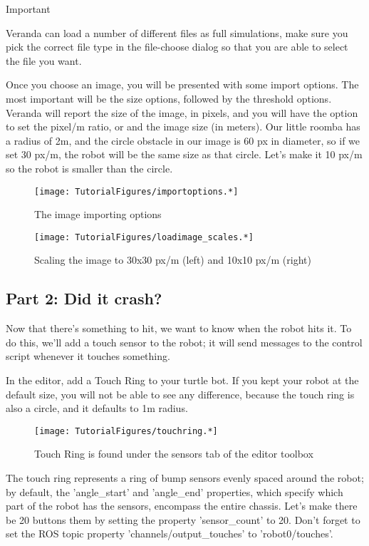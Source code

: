 Important

Veranda can load a number of different files as full simulations, make
sure you pick the correct file type in the file-choose dialog so that
you are able to select the file you want.

Once you choose an image, you will be presented with some import
options. The most important will be the size options, followed by the
threshold options. Veranda will report the size of the image, in pixels,
and you will have the option to set the pixel/m ratio, or and the image
size (in meters). Our little roomba has a radius of 2m, and the circle
obstacle in our image is 60 px in diameter, so if we set 30 px/m, the
robot will be the same size as that circle. Let's make it 10 px/m so the
robot is smaller than the circle.

\begin{figure}
\centering
\texttt{[image: TutorialFigures/importoptions.*]}
\caption{The image importing options}
\end{figure}

\begin{figure}
\centering
\texttt{[image: TutorialFigures/loadimage\_scales.*]}
\caption{Scaling the image to 30x30 px/m (left) and 10x10 px/m (right)}
\end{figure}

\hypertarget{part-2-did-it-crash}{%
\subsection{Part 2: Did it crash?}\label{part-2-did-it-crash}}

Now that there's something to hit, we want to know when the robot hits
it. To do this, we'll add a touch sensor to the robot; it will send
messages to the control script whenever it touches something.

In the editor, add a Touch Ring to your turtle bot. If you kept your
robot at the default size, you will not be able to see any difference,
because the touch ring is also a circle, and it defaults to 1m radius.

\begin{figure}
\centering
\texttt{[image: TutorialFigures/touchring.*]}
\caption{Touch Ring is found under the sensors tab of the editor
toolbox}
\end{figure}

The touch ring represents a ring of bump sensors evenly spaced around
the robot; by default, the 'angle\_start' and 'angle\_end' properties,
which specify which part of the robot has the sensors, encompass the
entire chassis. Let's make there be 20 buttons them by setting the
property 'sensor\_count' to 20. Don't forget to set the ROS topic
property 'channels/output\_touches' to 'robot0/touches'.

